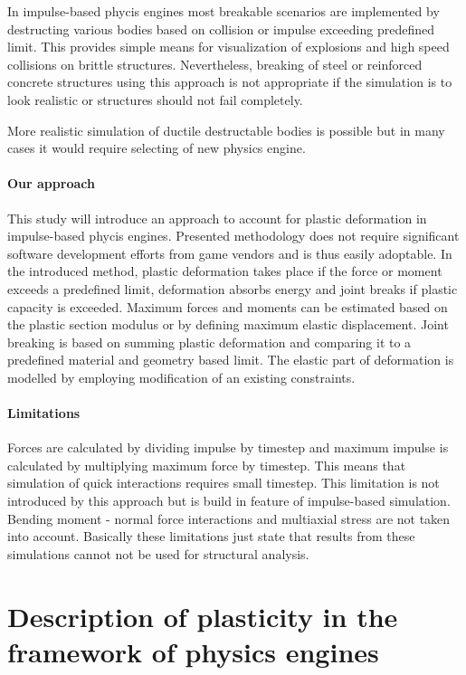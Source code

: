 \documentclass{jcgt}
\begin{document}
In impulse-based phycis engines most breakable scenarios  are implemented by destructing various bodies based on collision
or impulse exceeding predefined limit. This provides simple means for visualization of explosions and high speed collisions 
on brittle structures.  
Nevertheless, breaking of steel or reinforced concrete structures using this approach 
is not appropriate if the simulation is to look realistic or structures should not fail completely.

More realistic simulation of ductile destructable bodies is possible but in many cases it would require selecting of new physics engine.

\paragraph{Our approach}
This study will introduce an approach to account for plastic deformation in impulse-based phycis engines.   
Presented methodology does not require significant software development efforts from
game vendors and is thus easily adoptable. 
In the introduced method, plastic deformation takes place if the force or moment exceeds a predefined 
limit, deformation absorbs energy and joint breaks if plastic capacity is exceeded. 
Maximum forces and moments can be estimated based on the plastic section modulus or
by defining maximum elastic displacement.
Joint breaking is based on summing plastic deformation and comparing it to a
predefined material and geometry based limit. The elastic part of deformation is modelled by employing 
modification of an existing constraints.

\paragraph{Limitations}
Forces are calculated by dividing impulse by timestep and maximum impulse is calculated
by multiplying maximum force by timestep. 
This means that simulation of quick interactions requires small timestep.
This limitation is not introduced by this approach but is build in feature of impulse-based simulation.
Bending moment - normal force interactions and multiaxial stress are not taken into account. 
Basically these limitations just state that results from these simulations cannot not be used
for structural analysis. 

\section{Description of plasticity in the framework of physics engines}
\end{document}
